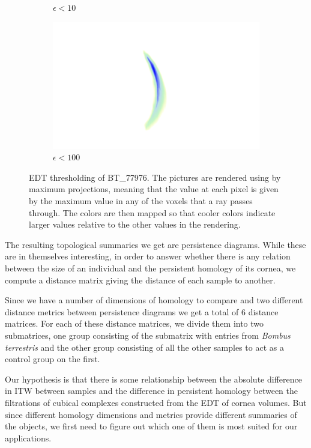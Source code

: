\begin{figure}[ht]
\begin{subfigure}{.3 \linewidth}
  \caption{$\epsilon < 10$}
  \end{subfigure}%
  \begin{subfigure}{.3 \linewidth}
  \centering
  \includegraphics[scale=0.2]{eps100.png}
  \caption{$\epsilon < 100$}
  \end{subfigure}
  \caption{\label{thresh} EDT thresholding of BT\_77976. The pictures are rendered using by maximum projections, meaning that the value at each pixel is given by the maximum value in any of the voxels that a ray passes through. The colors are then mapped so that cooler colors indicate larger values relative to the other values in the rendering.}
\end{figure}

The resulting topological summaries we get are persistence diagrams. While these are in themselves interesting, in order to answer whether there is any relation between the size of an individual and the persistent homology of its cornea, we compute a distance matrix giving the distance of each sample to another.

Since we have a number of dimensions of homology to compare and two different distance metrics between persistence diagrams we get a total of 6 distance matrices. For each of these distance matrices, we divide them into two submatrices, one group consisting of the submatrix with entries from \textit{Bombus terrestris} and the other group consisting of all the other samples to act as a control group on the first.

Our hypothesis is that there is some relationship between the absolute difference in ITW between samples and the difference in persistent homology between the filtrations of cubical complexes constructed from the EDT of cornea volumes. But since different homology dimensions and metrics provide different summaries of the objects, we first need to figure out which one of them is most suited for our applications.

